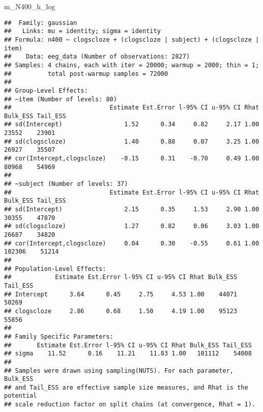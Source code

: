 \documentclass[12pt,ignorenonframetext,aspectratio=169]{beamer}
\newenvironment{Shaded}{\begin{snugshade}}{\end{snugshade}}
\newcommand{\NormalTok}[1]{#1}
\begin{document}
\begin{frame}[fragile]

\tiny

\begin{Shaded}
\begin{Highlighting}[]
\NormalTok{m_N400_h_log}
\end{Highlighting}
\end{Shaded}

\begin{verbatim}
##  Family: gaussian 
##   Links: mu = identity; sigma = identity 
## Formula: n400 ~ clogscloze + (clogscloze | subject) + (clogscloze | item) 
##    Data: eeg_data (Number of observations: 2827) 
## Samples: 4 chains, each with iter = 20000; warmup = 2000; thin = 1;
##          total post-warmup samples = 72000
## 
## Group-Level Effects: 
## ~item (Number of levels: 80) 
##                           Estimate Est.Error l-95% CI u-95% CI Rhat Bulk_ESS Tail_ESS
## sd(Intercept)                 1.52      0.34     0.82     2.17 1.00    23552    23901
## sd(clogscloze)                1.40      0.88     0.07     3.25 1.00    26927    35507
## cor(Intercept,clogscloze)    -0.15      0.31    -0.70     0.49 1.00    80968    54969
## 
## ~subject (Number of levels: 37) 
##                           Estimate Est.Error l-95% CI u-95% CI Rhat Bulk_ESS Tail_ESS
## sd(Intercept)                 2.15      0.35     1.53     2.90 1.00    30355    47870
## sd(clogscloze)                1.27      0.82     0.06     3.03 1.00    26687    34820
## cor(Intercept,clogscloze)     0.04      0.30    -0.55     0.61 1.00   102306    51214
## 
## Population-Level Effects: 
##            Estimate Est.Error l-95% CI u-95% CI Rhat Bulk_ESS Tail_ESS
## Intercept      3.64      0.45     2.75     4.53 1.00    44071    50269
## clogscloze     2.86      0.68     1.50     4.19 1.00    95123    55856
## 
## Family Specific Parameters: 
##       Estimate Est.Error l-95% CI u-95% CI Rhat Bulk_ESS Tail_ESS
## sigma    11.52      0.16    11.21    11.83 1.00   101112    54008
## 
## Samples were drawn using sampling(NUTS). For each parameter, Bulk_ESS
## and Tail_ESS are effective sample size measures, and Rhat is the potential
## scale reduction factor on split chains (at convergence, Rhat = 1).
\end{verbatim}

\end{frame}
\end{document}
